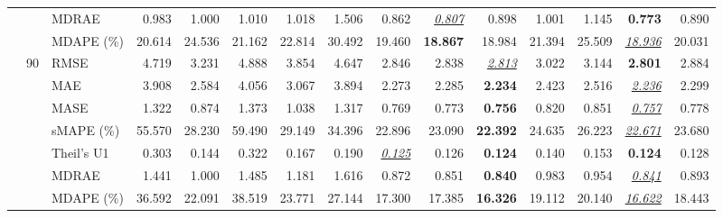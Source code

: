 \begin{table}[!htbp]
{\begin{tabular}{lllrrrrrrrrrrrr}
 &  & MDRAE & 0.983 & 1.000 & 1.010 & 1.018 & 1.506 & 0.862 & \underline{\textit{0.807}} & 0.898 & 1.001 & 1.145 & \textbf{0.773} & 0.890 \\
 &  & MDAPE (\%) & 20.614 & 24.536 & 21.162 & 22.814 & 30.492 & 19.460 & \textbf{18.867} & 18.984 & 21.394 & 25.509 & \underline{\textit{18.936}} & 20.031 \\
\cmidrule(lr){2-15}
 & 90 & RMSE & 4.719 & 3.231 & 4.888 & 3.854 & 4.647 & 2.846 & 2.838 & \underline{\textit{2.813}} & 3.022 & 3.144 & \textbf{2.801} & 2.884 \\
 &  & MAE & 3.908 & 2.584 & 4.056 & 3.067 & 3.894 & 2.273 & 2.285 & \textbf{2.234} & 2.423 & 2.516 & \underline{\textit{2.236}} & 2.299 \\
 &  & MASE & 1.322 & 0.874 & 1.373 & 1.038 & 1.317 & 0.769 & 0.773 & \textbf{0.756} & 0.820 & 0.851 & \underline{\textit{0.757}} & 0.778 \\
 &  & sMAPE (\%) & 55.570 & 28.230 & 59.490 & 29.149 & 34.396 & 22.896 & 23.090 & \textbf{22.392} & 24.635 & 26.223 & \underline{\textit{22.671}} & 23.680 \\
 &  & Theil's U1 & 0.303 & 0.144 & 0.322 & 0.167 & 0.190 & \underline{\textit{0.125}} & 0.126 & \textbf{0.124} & 0.140 & 0.153 & \textbf{0.124} & 0.128 \\
 &  & MDRAE & 1.441 & 1.000 & 1.485 & 1.181 & 1.616 & 0.872 & 0.851 & \textbf{0.840} & 0.983 & 0.954 & \underline{\textit{0.841}} & 0.893 \\
 &  & MDAPE (\%) & 36.592 & 22.091 & 38.519 & 23.771 & 27.144 & 17.300 & 17.385 & \textbf{16.326} & 19.112 & 20.140 & \underline{\textit{16.622}} & 18.443 \\
\bottomrule
\end{tabular}}
\end{table}